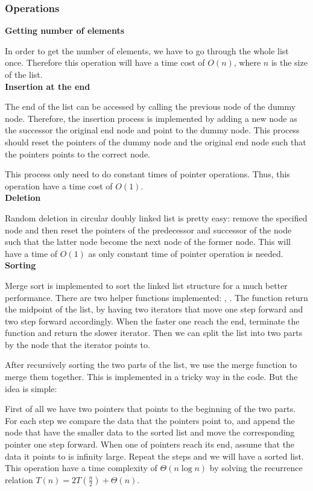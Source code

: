 \documentclass{article}
\begin{document}
	\pagebreak	
	
	\subsubsection{Operations}
	\textbf{Getting number of elements}
	
	In order to get the number of elements, we have to go through the whole list once. Therefore this operation will have a time cost of $O(n)$, where $n$ is the size of the list.\\ 
	
	\noindent\textbf{Insertion at the end}
	
	The end of the list can be accessed by calling the previous node of the dummy node. Therefore, the insertion process is implemented by adding a new node as the successor the original end node and point to the dummy node. This process should reset the pointers of the dummy node and the original end node such that the pointers points to the correct node. 

	This process only need to do constant times of pointer operations. Thus, this operation have a time cost of $O(1)$.\\
	
	\noindent\textbf{Deletion}
	
	Random deletion in circular doubly linked list is pretty easy: remove the specified node and then reset the pointers of the predecessor and successor of the node such that the latter node become the next node of the former node.
	This will have a time of $O(1)$ as only constant time of pointer operation is needed.\\
	
	\noindent\textbf{Sorting}
	
	Merge sort is implemented to sort the linked list structure for a much better performance. There are two helper functions implemented: , . 
	The  function return the midpoint of the list, by having two iterators that move one step forward and two step forward accordingly. When the faster one reach the end, terminate the function and return the slower iterator. Then we can split the list into two parts by the node that the iterator points to.
	
	After recursively sorting the two parts of the list, we use the merge function to merge them together. This is implemented in a tricky way in the code. But the idea is simple: 
\par	 First of all we have two pointers that points to the beginning of the two parts. For each step we compare the data that the pointers point to, and append the node that have the smaller data to the sorted list and move the corresponding pointer one step forward. When one of pointers reach its end, assume that the data it points to is infinity large. Repeat the steps and we will have a sorted list. \\
	This operation have a time complexity of $\Theta(n\log n)$ by solving the recurrence relation $T(n) = 2T(\frac{n}{2}) + \Theta(n)$. \\
	 
\end{document}
